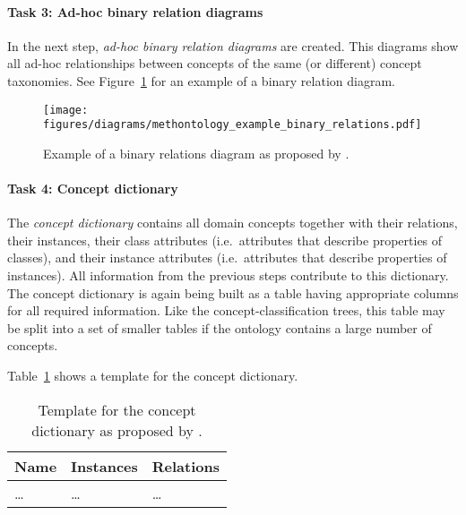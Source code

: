 \paragraph{Task 3: Ad-hoc binary relation diagrams}

In the next step, \emph{ad-hoc binary relation diagrams} are created. This diagrams show all ad-hoc relationships between concepts of the same (or different) concept taxonomies. See Figure~\ref{fig:methontology_example_binary_relations} for an example of a binary relation diagram.

\begin{figure}
\centering
\texttt{[image: figures/diagrams/methontology\_example\_binary\_relations.pdf]}
\caption[Example of a binary relations diagram]{Example of a binary relations diagram as proposed by \methontology.}
\label{fig:methontology_example_binary_relations}
\end{figure}

\paragraph{Task 4: Concept dictionary}

The \emph{concept dictionary} contains all domain concepts together with their relations, their instances, their class attributes (i.e.\ attributes that describe properties of classes), and their instance attributes (i.e.\ attributes that describe properties of instances). All information from the previous steps contribute to this dictionary. The concept dictionary is again being built as a table having appropriate columns for all required information. Like the concept-classification trees, this table may be split into a set of smaller tables if the ontology contains a large number of concepts.

Table~\ref{table:methontology_example_concept_dictionary} shows a template for the concept dictionary.

\begin{table}
\centering
\begin{tabular}{|p{}|p{}|p{}|}
  \hline
  \textbf{Name} & \textbf{Instances} & \textbf{Relations} \\
  \hline\hline
  … & … & … \\
  \hline
\end{tabular}
\caption[Template for the concept dictionary]{Template for the concept dictionary as proposed by \methontology.}
\label{table:methontology_example_concept_dictionary}
\end{table}

